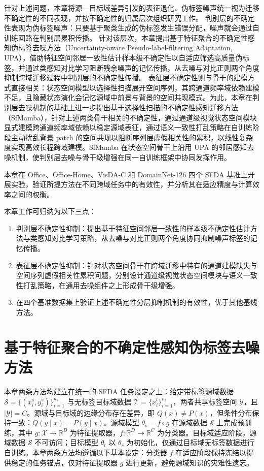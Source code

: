针对上述问题，本章将源—目标域差异引发的表征退化、伪标签噪声统一视为迁移不确定性的不同表现，并按不确定性的归属层次组织研究工作。
判别层的不确定性表现为伪标签噪声：只要基于聚类生成的伪标签发生错误分配，噪声就会通过自训练回路在判别层累积传播。
针对该层次，本章提出基于特征聚合的不确定性感知伪标签去噪方法（Uncertainty-aware Pseudo-label-filtering Adaptation, UPA），借助特征空间邻居一致性估计样本级不确定性以自适应筛选高质量伪标签，并通过类感知对比学习阻断残余噪声的记忆传播，从去噪与对比正则两个角度抑制跨域迁移过程中判别层的不确定性传播。
表征层不确定性则与骨干的建模方式直接相关：状态空间模型以选择性扫描展开空间序列，其跨通道频率域依赖建模不足，且隐藏状态演化会记忆源域中前景与背景的空间共现模式。为此，本章在判别层去噪机制的基础上进一步提出基于选择性扫描的不确定性感知迁移方法（SfMamba），针对上述两类骨干相关的不确定性，通过通道级视觉状态空间模块显式建模跨通道频率域依赖以稳定源域表征，通过语义一致性打乱策略在自训练阶段主动扰乱背景 patch 的空间共现以阻断序列层虚假相关性的累积，以线性复杂度实现高效长程跨域建模。SfMamba 在状态空间骨干上沿用 UPA 的邻居感知去噪机制，使判别层去噪与骨干级增强在同一自训练框架中协同发挥作用。

本章在 Office、Office-Home、VisDA-C 和 DomainNet-126 四个 SFDA 基准上开展实验，验证所提方法在不同跨域任务中的有效性，并分析其在适应精度与计算效率之间的权衡。

本章工作可归纳为以下三点：
\begin{enumerate}
    \item 判别层不确定性抑制：提出基于特征空间邻居一致性的样本级不确定性估计方法与类感知对比学习策略，从去噪与对比正则两个角度协同抑制噪声标签的记忆传播。
    \item 表征层不确定性抑制：针对状态空间骨干在跨域迁移中特有的通道建模缺失与空间序列虚假相关性累积问题，分别设计通道级视觉状态空间模块与语义一致性打乱策略，在通用去噪组件之上形成骨干级增强。
    \item 在四个基准数据集上验证上述不确定性分层抑制机制的有效性，优于其他基线方法。
\end{enumerate}

\section{基于特征聚合的不确定性感知伪标签去噪方法}

\label{sec:chap2_upa}

本章两条方法均建立在统一的 SFDA 任务设定之上：给定带标签源域数据 $\mathcal{S} = \{(x_i^s, y_i^s)\}_{i=1}^{n_s}$ 与无标签目标域数据 $\mathcal{T} = \{x_i^t\}_{i=1}^{n_t}$，两者共享标签空间 $\mathcal{Y}$，且 $|\mathcal{Y}| = C$。源域与目标域的边缘分布存在差异，即 $Q(x) \neq P(x)$，但条件分布保持一致：$Q(y \mid x) = P(y \mid x)$。源域模型 $\theta_s = f \circ g$ 在源域数据 $\mathcal{S}$ 上完成预训练，其中 $g: \mathcal{X} \to \mathbb{R}^D$ 为特征提取器，$f: \mathbb{R}^D \to \mathbb{R}^C$ 为分类器。目标域适应阶段，源域数据 $\mathcal{S}$ 不可访问；目标模型 $\theta_t$ 以 $\theta_s$ 为初始化，仅通过目标域无标签数据进行自训练。本章两条方法均遵循以下基本设定：分类器 $f$ 在适应阶段保持冻结以提供稳定的任务锚点，仅对特征提取器 $g$ 进行更新，避免源域知识的灾难性遗忘。

